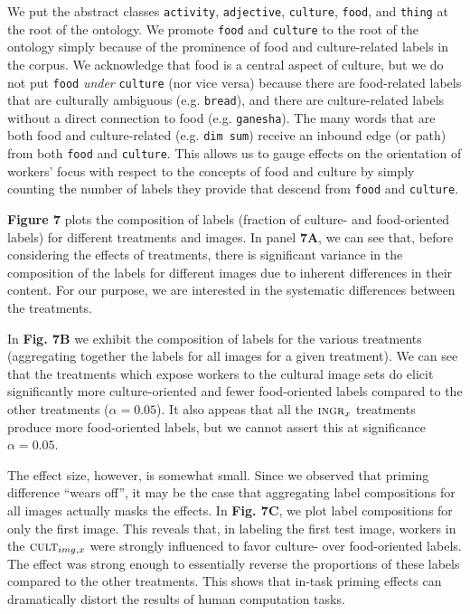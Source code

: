 \documentclass[a4paper]{report}
\begin{document}
We put the abstract classes  \texttt{activity}, 
\texttt{adjective}, \texttt{culture}, \texttt{food}, and \texttt{thing} at 
the root of the ontology.  We promote \texttt{food} and \texttt{culture}
to the root of the ontology simply because of the prominence of food and 
culture-related labels in the corpus.  We acknowledge that food is a 
central aspect of culture, but we do not put \texttt{food} \textit{under} 
\texttt{culture}
(nor vice versa) because there are food-related labels that are culturally 
ambiguous (e.g. \texttt{bread}), and there are culture-related labels without 
a direct connection to food (e.g. \texttt{ganesha}).  The many words that are 
both food and culture-related (e.g. \texttt{dim sum}) receive an inbound edge 
(or path) from both \texttt{food} and \texttt{culture}.
This allows us to gauge effects on the orientation of workers' focus
with respect to the concepts of food and culture by simply counting the number 
of labels they provide that descend from \texttt{food} and \texttt{culture}. 

\textbf{Figure 7} plots the composition of labels (fraction of culture- and 
food-oriented labels) for different treatments and images.  In 
panel \textbf{7A}, we can see that, before considering the effects of 
treatments, there is significant variance in the composition of the labels 
for different images due to inherent differences in their content.  For our 
purpose, we are interested in the systematic differences between 
the treatments.

In \textbf{Fig. 7B} we exhibit the composition of labels for the various 
treatments (aggregating together the labels for all images for a given 
treatment).  We can see that the treatments which expose workers to the
cultural image sets do elicit significantly more culture-oriented and fewer
food-oriented labels compared to the other treatments ($\alpha=0.05$).  It 
also appeas that all the $\textsc{ingr}_x$ treatments produce more 
food-oriented labels, but we cannot assert this at significance 
$\alpha = 0.05$. 

The effect size, however, is somewhat small.  Since we observed that priming 
difference ``wears off'', it may be the case 
that aggregating label compositions for all images actually masks the effects. 
In \textbf{Fig. 7C}, we plot label compositions for only the first
image.  This reveals that, in labeling the first test image, workers in the
$\textsc{cult}_{img,x}$ were strongly influenced to favor culture- over 
food-oriented labels.  The effect was strong enough to essentially reverse 
the proportions of these labels compared to the other treatments.  
This shows that in-task priming effects can dramatically distort the results 
of human computation tasks.
\end{document}
